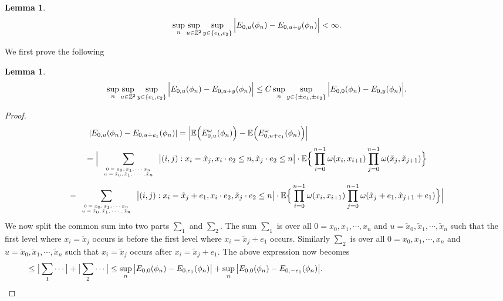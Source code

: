 \documentclass[11pt]{amsart}
\newtheorem{lemma}[theorem]{\sc Lemma}
\begin{document}
\bigskip

\begin{lemma}
\label{2sup}
\[ \sup_n \sup_{u \in \mathbb{Z}^2} \sup_{ y \in \lbrace e_1,e_2 \rbrace }\Big{\vert}E_{0,u}(\phi_n ) 
- E_{0,u+y}(\phi_n ) \Big{\vert}  < \infty.\]
\end{lemma}
We first prove the following 

\bigskip

\begin{lemma}
\label{2sup1sup}
 \[ \sup_n \sup_{u \in \mathbb{Z}^2} \sup_{ y \in \lbrace e_1,e_2 \rbrace }\Big{\vert}E_{0,u}(\phi_n ) 
- E_{0,u+y}(\phi_n ) \Big{\vert}  \leq C \sup_n \sup_{ y \in \lbrace \pm e_1, \pm e_2 \rbrace } \Big{\vert}E_{0,0}(\phi_n ) 
- E_{0,y}(\phi_n ) \Big{\vert}.\]
\end{lemma}
\begin{proof} 
\[ \vert E_{0,u}(\phi_n)-E_{0,u+e_1}(\phi_n)\vert = \Big\vert \mathbb{E}\Big{(}E_{0,u}^{\omega}(\phi_n)\Big{)} - \mathbb{E}\Big{(}E_{0,u+e_1}^{\omega}(\phi_n)\Big{)}  \Big\vert \hspace{5cm}\]
\[ = \Big{\vert} \sum_{\begin{tiny}\begin{array}{c}0=x_0,x_1, \cdots x_n \\ u=\tilde{x}_0,\tilde{x}_1, \cdots , \tilde{x}_n \end{array}\end{tiny}} \big{\vert} (i,j):x_i=\tilde{x}_j, x_i \cdot e_2 \le n, \tilde{x}_j \cdot e_2 \le n \big{\vert} \cdot 
\mathbb{E} \Big{\lbrace}\prod_{i=0}^{n-1}\omega(x_i,x_{i+1})\prod_{j=0}^{n-1}\omega(\tilde{x}_j, \tilde{x}_{j+1} )   \Big{\rbrace} \]
\[ - \sum_{\begin{tiny}\begin{array}{c}0=x_0,x_1, \cdots x_n \\ u=\tilde{x}_0,\tilde{x}_1, \cdots , \tilde{x}_n \end{array}\end{tiny}} \big{\vert} (i,j):x_i=\tilde{x}_j+e_1, x_i \cdot e_2,\tilde{x}_j \cdot e_2 \le n \big{\vert}\cdot \mathbb{E} \Big{\lbrace}\prod_{i=0}^{n-1}\omega(x_i,x_{i+1})\prod_{j=0}^{n-1}\omega(\tilde{x}_j+e_1, \tilde{x}_{j+1}+e_1 )   \Big{\rbrace} \Big{\vert}\]
We now split the common sum into two parts $\sum_1$ and $\sum_2$. The sum $\sum_1$ is over all $0=x_0,x_1,\cdots,x_n$ and $u=\tilde{x}_0,\tilde{x}_1,\cdots,\tilde{x}_n$ such that the first level where $x_i=\tilde{x}_j$ occurs is before the first level where $x_i=\tilde{x}_j+e_1$ occurs. Similarly $\sum_2$ is over all $0=x_0,x_1,\cdots,x_n$ and $u=\tilde{x}_0,\tilde{x}_1,\cdots,\tilde{x}_n$ such that $x_i=\tilde{x}_j$ occurs after $x_i=\tilde{x}_j+e_1$. The above expression now becomes 
 \[ \hspace{1cm}\leq \big{\vert} \sum_1 \cdots \big{\vert} + \big{\vert} \sum_2 \cdots \big{\vert} \leq \sup_n \big{\vert}E_{0,0}(\phi_n)-E_{0,e_1}(\phi_n) \big{\vert} + \sup_n \big{\vert}E_{0,0}(\phi_n)-E_{0,-e_1}(\phi_n) \big{\vert}.\hspace{8cm}\] 

\end{proof}
\end{document}
